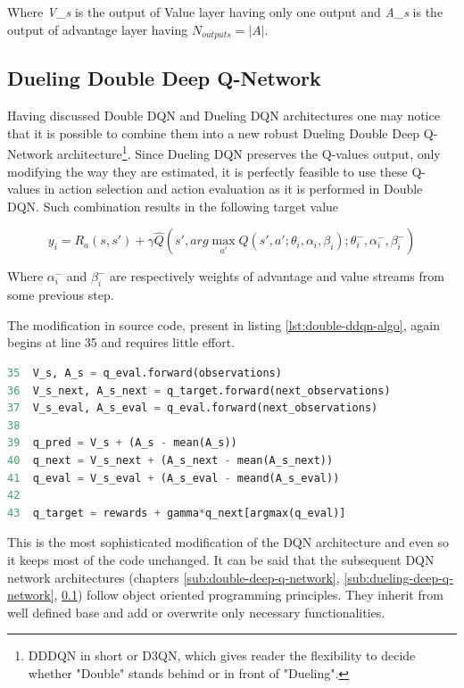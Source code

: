 Where \emph{V\_s} is the output of Value layer having only one output and \emph{A\_s} is the output of advantage layer having $N_{outputs}= |A|$.

\subsection{Dueling Double Deep Q-Network}
\label{sub:dueling-double-deep-q-network}

Having discussed Double DQN and Dueling DQN architectures one may notice that it is possible to combine them into a new robust Dueling
Double Deep Q-Network architecture\footnote{DDDQN in short or D3QN, which gives reader the flexibility to decide whether "Double" stands
behind or in front of "Dueling".}. Since Dueling DQN preserves the Q-values output, only modifying the way they are estimated, it is
perfectly feasible to use these Q-values in action selection and action evaluation as it is performed in Double DQN. Such combination
results in the following target value

\begin{equation}
    y_i = R_a(s, s') + \gamma \hat{Q}(s', arg\max_{a'}Q(s', a'; \theta_i, \alpha_i, \beta_i); \theta^-_i, \alpha^-_i, \beta^-_i)
\label{eq:dueling-double-dqn-target-value}
\end{equation}

Where $\alpha^-_i$ and $\beta^-_i$ are respectively weights of advantage and value streams from some previous step.

The modification in source code, present in listing \ref{lst:double-ddqn-algo}, again begins at line 35 and requires little effort.

\begin{lstlisting}[language=Python, caption={Dueling Double Deep Q-learning modification.}, label={lst:double-ddqn-algo}]
35  V_s, A_s = q_eval.forward(observations)
36  V_s_next, A_s_next = q_target.forward(next_observations)
37  V_s_eval, A_s_eval = q_eval.forward(next_observations)
38    
39  q_pred = V_s + (A_s - mean(A_s))
40  q_next = V_s_next + (A_s_next - mean(A_s_next))
41  q_eval = V_s_eval + (A_s_eval - meand(A_s_eval))
42    
43  q_target = rewards + gamma*q_next[argmax(q_eval)]
\end{lstlisting}

This is the most sophisticated modification of the DQN architecture and even so it keeps most of the code unchanged. It can be said that
the subsequent DQN network architectures (chapters \ref{sub:double-deep-q-network}, \ref{sub:dueling-deep-q-network},
\ref{sub:dueling-double-deep-q-network}) follow object oriented programming principles. They inherit from well defined base and add or
overwrite only necessary functionalities.

